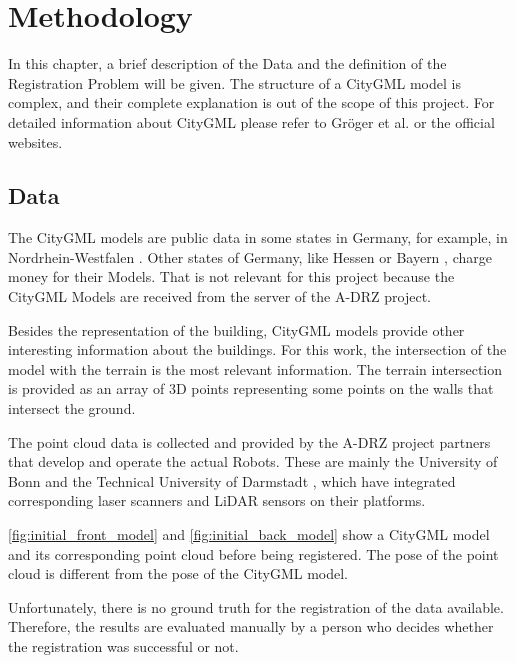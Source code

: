 

    \chapter{Methodology}
        In this chapter, a brief description of the Data and the definition of the Registration Problem will be given.
        The structure of a CityGML model is complex, and their complete explanation is out of the scope of this project.
        For detailed information about CityGML please refer to Gröger et al. \cite{Groger_2012_OGC} or the official websites.

    \section{Data}   
        The CityGML models are public data in some states in Germany, for example, in Nordrhein-Westfalen \cite{NRW3DModel_online}. 
        Other states of Germany, like Hessen \cite{Hessen3DModel_online} or Bayern \cite{Bayern3DModel_online}, charge money for their Models.
        That is not relevant for this project because the CityGML Models are received from the server of the A-DRZ project.

        Besides the representation of the building, CityGML models provide other interesting information about the buildings.
        For this work, the intersection of the model with the terrain is the most relevant information.
        The terrain intersection is provided as an array of 3D points representing some points on the walls that intersect the ground. 
        
        The point cloud data is collected and provided by the A-DRZ project partners that develop and operate the actual Robots.
        These are mainly the University of Bonn \cite{UniBonn_online} and the Technical University of Darmstadt \cite{TUDarmstadt_online},
        which have integrated corresponding laser scanners and LiDAR sensors on their platforms.

        \autoref{fig:initial_front_model} and \autoref{fig:initial_back_model} show a CityGML model and its corresponding point cloud
        before being registered. The pose of the point cloud is different from the pose of the CityGML model.
            
        Unfortunately, there is no ground truth for the registration of the data available. 
        Therefore, the results are evaluated manually by a person who decides whether the registration was successful or not.

